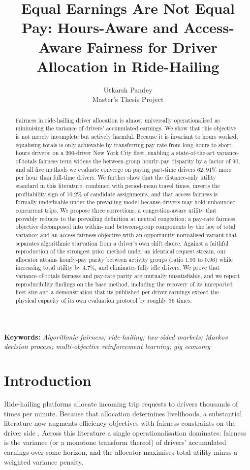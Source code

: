 \documentclass[10pt,twocolumn]{article}
\title{\textbf{Equal Earnings Are Not Equal Pay: Hours-Aware and Access-Aware Fairness for Driver Allocation in Ride-Hailing}}
\author{Utkarsh Pandey\\ \small Master's Thesis Project}
\date{}
\begin{document}
\maketitle

\begin{abstract}
Fairness in ride-hailing driver allocation is almost universally operationalised as minimising the variance of drivers' accumulated earnings. We show that this objective is not merely incomplete but actively harmful. Because it is invariant to hours worked, equalising totals is only achievable by transferring pay rate from long-hours to short-hours drivers: on a 200-driver New York City fleet, enabling a state-of-the-art variance-of-totals fairness term widens the between-group hourly-pay disparity by a factor of 90, and all five methods we evaluate converge on paying part-time drivers 62--91\% more per hour than full-time drivers. We further show that the distance-only utility standard in this literature, combined with period-mean travel times, inverts the profitability sign of 10.2\% of candidate assignments, and that access fairness is formally undefinable under the prevailing model because drivers may hold unbounded concurrent trips. We propose three corrections: a congestion-aware utility that provably reduces to the prevailing definition at neutral congestion; a pay-rate fairness objective decomposed into within- and between-group components by the law of total variance; and an access-fairness objective with an opportunity-normalised variant that separates algorithmic starvation from a driver's own shift choice. Against a faithful reproduction of the strongest prior method under an identical request stream, our allocator attains hourly-pay parity between activity groups (ratio 1.93 to 0.96) while increasing total utility by 4.7\%, and eliminates fully idle drivers. We prove that variance-of-totals fairness and pay-rate parity are mutually unsatisfiable, and we report reproducibility findings on the base method, including the recovery of its unreported fleet size and a demonstration that its published per-driver earnings exceed the physical capacity of its own evaluation protocol by roughly 36 times.
\end{abstract}
\noindent\textbf{Keywords:} \emph{Algorithmic fairness; ride-hailing; two-sided markets; Markov decision process; multi-objective reinforcement learning; gig economy}

\section{Introduction}
Ride-hailing platforms allocate incoming trip requests to drivers thousands of times per minute. Because that allocation determines livelihoods, a substantial literature now augments efficiency objectives with fairness constraints on the driver side \cite{lesmana2019,suhr2019,nanda2020,xu2020,shi2021,raman2021,kang2024}. Across this literature a single operationalisation dominates: fairness is the variance (or a monotone transform thereof) of drivers' accumulated earnings over some horizon, and the allocator maximises total utility minus a weighted variance penalty.
\end{document}
